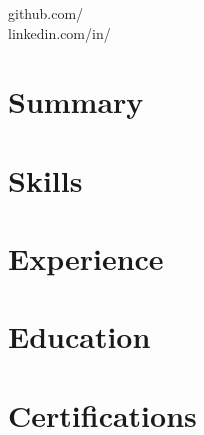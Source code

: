 \documentclass[11pt,letterpaper]{article}
\providecommand{\ifdefempty}[3]{#3}
\begin{document}
\raggedright

\begin{center}
{\LARGE \myName}\\[2pt]
\myPosition\\[2pt]
\myEmail
\ifdefempty{\myPhone}{}{\\\myPhone}
\ifdefempty{\myCity}{}{\\\myCity}
\ifdefempty{\myGithub}{}{\\github.com/\myGithub}
\ifdefempty{\myLinkedin}{}{\\linkedin.com/in/\myLinkedin}
\end{center}

\section*{Summary}
\mySummary

\ifdefempty{\mySkills}{}{%
\section*{Skills}
\begin{itemize}
\mySkills
\end{itemize}
}

\ifdefempty{\myExperience}{}{%
\section*{Experience}
\myExperience
}

\ifdefempty{\myEducation}{}{%
\section*{Education}
\myEducation
}

\ifdefempty{\myCertifications}{}{%
\section*{Certifications}
\myCertifications
}
\end{document}
